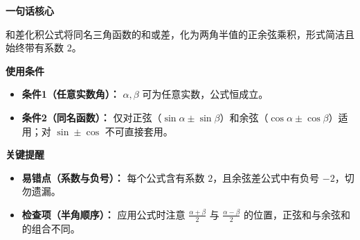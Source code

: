 \begin{summarybox}
	\textbf{\textcolor{CSummary}{一句话核心}}

	和差化积公式将同名三角函数的和或差，化为两角半值的正余弦乘积，形式简洁且始终带有系数 $2$。

	\medskip
	\textbf{\textcolor{CSummary}{使用条件}}
	\begin{itemize}[leftmargin=*, itemsep=0.5em, topsep=0.4em]
		\item \textbf{条件1（任意实数角）：} $\alpha,\beta$ 可为任意实数，公式恒成立。
		\item \textbf{条件2（同名函数）：} 仅对正弦（$\sin\alpha\pm\sin\beta$）和余弦（$\cos\alpha\pm\cos\beta$）适用；对 $\sin\pm\cos$ 不可直接套用。
	\end{itemize}

	\medskip
	\textbf{\textcolor{CSummary}{关键提醒}}
	\begin{itemize}[leftmargin=*, itemsep=0.5em, topsep=0.4em]
		\item \textbf{易错点（系数与负号）：} 每个公式含有系数 $2$，且余弦差公式中有负号 $-2$，切勿遗漏。
		\item \textbf{检查项（半角顺序）：} 应用公式时注意 $\frac{\alpha+\beta}{2}$ 与 $\frac{\alpha-\beta}{2}$ 的位置，正弦和与余弦和的组合不同。
	\end{itemize}
\end{summarybox}

